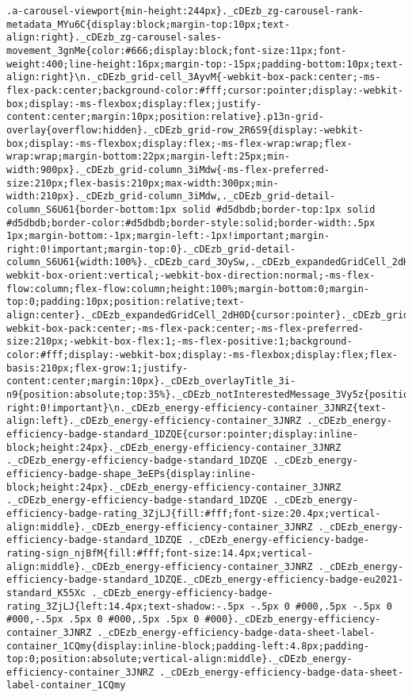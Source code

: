 \documentclass[
]{article}
\begin{document}
\begin{verbatim}
.a-carousel-viewport{min-height:244px}._cDEzb_zg-carousel-rank-metadata_MYu6C{display:block;margin-top:10px;text-align:right}._cDEzb_zg-carousel-sales-movement_3gnMe{color:#666;display:block;font-size:11px;font-weight:400;line-height:16px;margin-top:-15px;padding-bottom:10px;text-align:right}\n._cDEzb_grid-cell_3AyvM{-webkit-box-pack:center;-ms-flex-pack:center;background-color:#fff;cursor:pointer;display:-webkit-box;display:-ms-flexbox;display:flex;justify-content:center;margin:10px;position:relative}.p13n-grid-overlay{overflow:hidden}._cDEzb_grid-row_2R6S9{display:-webkit-box;display:-ms-flexbox;display:flex;-ms-flex-wrap:wrap;flex-wrap:wrap;margin-bottom:22px;margin-left:25px;min-width:900px}._cDEzb_grid-column_3iMdw{-ms-flex-preferred-size:210px;flex-basis:210px;max-width:300px;min-width:210px}._cDEzb_grid-column_3iMdw,._cDEzb_grid-detail-column_S6U61{border-bottom:1px solid #d5dbdb;border-top:1px solid #d5dbdb;border-color:#d5dbdb;border-style:solid;border-width:.5px 1px;margin-bottom:-1px;margin-left:-1px!important;margin-right:0!important;margin-top:0}._cDEzb_grid-detail-column_S6U61{width:100%}._cDEzb_card_3OySw,._cDEzb_expandedGridCell_2dH0D{-webkit-box-orient:vertical;-webkit-box-direction:normal;-ms-flex-flow:column;flex-flow:column;height:100%;margin-bottom:0;margin-top:0;padding:10px;position:relative;text-align:center}._cDEzb_expandedGridCell_2dH0D{cursor:pointer}._cDEzb_gridExpansion_vuxFX{-webkit-box-pack:center;-ms-flex-pack:center;-ms-flex-preferred-size:210px;-webkit-box-flex:1;-ms-flex-positive:1;background-color:#fff;display:-webkit-box;display:-ms-flexbox;display:flex;flex-basis:210px;flex-grow:1;justify-content:center;margin:10px}._cDEzb_overlayTitle_3i-n9{position:absolute;top:35%}._cDEzb_notInterestedMessage_3Vy5z{position:absolute;top:50%}._cDEzb_image_3QFmU{opacity:.1}._cDEzb_feedbackRow_ZcBSK{margin-right:0!important}\n._cDEzb_energy-efficiency-container_3JNRZ{text-align:left}._cDEzb_energy-efficiency-container_3JNRZ ._cDEzb_energy-efficiency-badge-standard_1DZQE{cursor:pointer;display:inline-block;height:24px}._cDEzb_energy-efficiency-container_3JNRZ ._cDEzb_energy-efficiency-badge-standard_1DZQE ._cDEzb_energy-efficiency-badge-shape_3eEPs{display:inline-block;height:24px}._cDEzb_energy-efficiency-container_3JNRZ ._cDEzb_energy-efficiency-badge-standard_1DZQE ._cDEzb_energy-efficiency-badge-rating_3ZjLJ{fill:#fff;font-size:20.4px;vertical-align:middle}._cDEzb_energy-efficiency-container_3JNRZ ._cDEzb_energy-efficiency-badge-standard_1DZQE ._cDEzb_energy-efficiency-badge-rating-sign_njBfM{fill:#fff;font-size:14.4px;vertical-align:middle}._cDEzb_energy-efficiency-container_3JNRZ ._cDEzb_energy-efficiency-badge-standard_1DZQE._cDEzb_energy-efficiency-badge-eu2021-standard_K55Xc ._cDEzb_energy-efficiency-badge-rating_3ZjLJ{left:14.4px;text-shadow:-.5px -.5px 0 #000,.5px -.5px 0 #000,-.5px .5px 0 #000,.5px .5px 0 #000}._cDEzb_energy-efficiency-container_3JNRZ ._cDEzb_energy-efficiency-badge-data-sheet-label-container_1CQmy{display:inline-block;padding-left:4.8px;padding-top:0;position:absolute;vertical-align:middle}._cDEzb_energy-efficiency-container_3JNRZ ._cDEzb_energy-efficiency-badge-data-sheet-label-container_1CQmy 
\end{verbatim}
\end{document}
